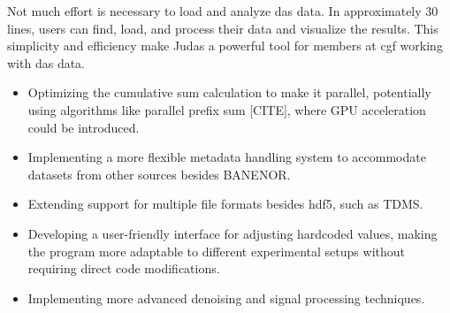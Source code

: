 Not much effort is necessary to load and analyze \acrshort{das} data. In approximately 30 lines, users can find, load, and process their data and visualize the results. This simplicity and efficiency make Judas a powerful tool for members at \acrshort{cgf} working with \acrshort{das} data.

\begin{itemize}
    \item Optimizing the cumulative sum calculation to make it parallel, potentially using algorithms like parallel prefix sum [CITE], where GPU acceleration could be introduced.
    \item Implementing a more flexible metadata handling system to accommodate datasets from other sources besides BANENOR.
    \item Extending support for multiple file formats besides \acrshort{hdf5}, such as TDMS.
    \item Developing a user-friendly interface for adjusting hardcoded values, making the program more adaptable to different experimental setups without requiring direct code modifications.
    \item Implementing more advanced denoising and signal processing techniques.
\end{itemize}


